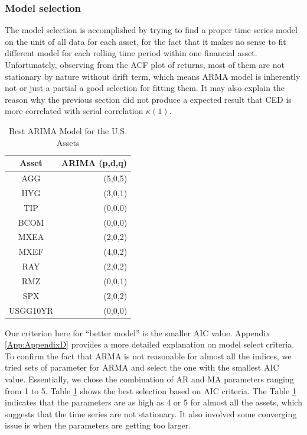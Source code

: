 \documentclass[11pt]{article}
\begin{document}
\subsubsection{Model selection}
The model selection is accomplished by trying to find a proper time series model on the unit of all data for each asset, for the fact that it makes no sense to fit different model for each rolling time period within one financial asset.  Unfortunately, observing from the ACF plot of returns, most of them are not stationary by nature without drift term, which means ARMA model is inherently not or just a partial a good selection for fitting them. It may also explain the reason why the previous section did not produce a expected result that CED is more correlated with serial correlation $\kappa(1)$.
\begin{table}
\caption{Best ARIMA Model for the U.S. Assets }
\centering 
\begin{tabular}{ | c || r | } 
 \hline
Asset & ARIMA (p,d,q) \\
  \hline \hline
AGG & (5,0,5) \\ 
HYG & (3,0,1) \\ 
TIP &  (0,0,0)\\ 
BCOM & (0,0,0)\\ 
MXEA & (2,0,2) \\ 
MXEF & (4,0,2)\\ 
RAY &  (2,0,2)\\ 
RMZ & (0,0,1) \\ 
SPX & (2,0,2) \\ 
USGG10YR & (0,0,0) \\
 \hline
\end{tabular}
\label{table:BestArima}
\end{table}


Our criterion here for ``better model'' is the smaller AIC value. Appendix \ref{App:AppendixD} provides a more detailed explanation on model select criteria. To confirm the fact that ARMA is not reasonable for almost all the indices, we tried sets of parameter for ARMA and select the one with the smallest AIC value. Essentially, we chose the combination of AR and MA parameters ranging from 1 to 5.  Table \ref{table:BestArima} shows the best selection based on AIC criteria. The Table \ref{table:BestArima} indicates that the parameters are as high as 4 or 5 for almost all the assets, which suggests that the time series are not stationary. It also involved some converging issue is when the parameters are getting too larger.
\end{document}
